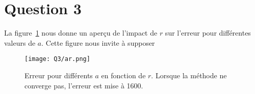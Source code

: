\section{Question 3}

La figure~\ref{fig:ar} nous donne un aperçu de l'impact de $r$
sur l'erreur pour différentes valeurs de $a$.
Cette figure nous invite à supposer

\begin{figure}
  \centering
  \texttt{[image: Q3/ar.png]}
  \caption{Erreur pour différents $a$ en fonction de $r$.
  Lorsque la méthode ne converge pas, l'erreur est mise à 1600.}
  \label{fig:ar}
\end{figure}

